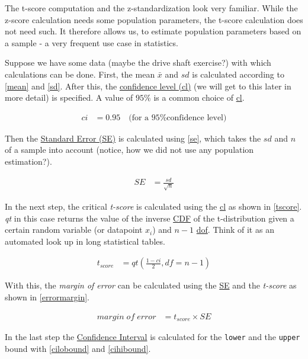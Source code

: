 \documentclass[
  a4paper,
]{scrbook}
\begin{document}
The t-score computation and the z-standardization look very familiar.
While the z-score calculation needs some population parameters, the
t-score calculation does not need such. It therefore allows us, to
estimate population parameters based on a sample - a very frequent use
case in statistics.

Suppose we have some data (maybe the drive shaft exercise?) with which
calculations can be done. First, the mean \(\bar{x}\) and \(sd\) is
calculated according to \eqref{mean} and \eqref{sd}. After this, the
\hyperref[acronyms_cl]{confidence level (cl)} (we will get to this later
in more detail) is specified. A value of \(95\%\) is a common choice of
\hyperref[acronyms_cl]{cl}.

\begin{align}
ci &= 0.95 \quad \text{(for a 95\% confidence level)}
\end{align}

Then the \hyperref[acronyms_SE]{Standard Error (SE)} is calculated using
\eqref{se}, which takes the \(sd\) and \(n\) of a sample into account
(notice, how we did not use any population estimation?).

\begin{align}
SE &= \frac{sd}{\sqrt{n}} \label{se}
\end{align}

In the next step, the critical \emph{t-score} is calculated using the
\hyperref[acronyms_cl]{cl} as shown in \eqref{tscore}. \emph{qt} in this
case returns the value of the inverse \hyperref[acronyms_CDF]{CDF} of
the t-distribution given a certain random variable (or datapoint
\(x_i\)) and \(n-1\) \hyperref[acronyms_dof]{dof}. Think of it as an
automated look up in long statistical tables.

\begin{align}
t_{score} &= qt\left(\frac{1 - ci}{2}, df = n - 1\right) \label{tscore}
\end{align}

With this, the \emph{margin of error} can be calculated using the
\hyperref[acronyms_SE]{SE} and the \emph{t-score} as shown in
\eqref{errormargin}.

\begin{align}
margin\;of\;error &= t_{score} \times SE \label{errormargin}
\end{align}

In the last step the \hyperref[ci]{Confidence Interval} is calculated
for the \texttt{lower} and the \texttt{upper} bound with
\eqref{cilobound} and \eqref{cihibound}.
\end{document}
